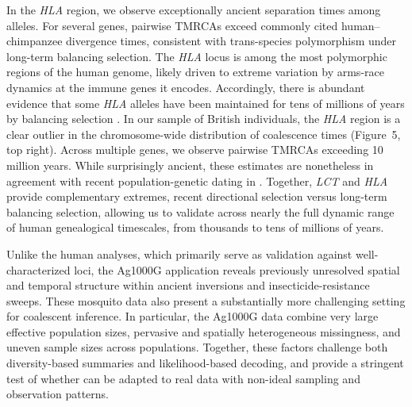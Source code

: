 \documentclass[9pt,twocolumn,twoside]{pnas-new}
\begin{document}
In the \emph{HLA} region,
we observe exceptionally ancient separation times among alleles.
For several genes,
pairwise TMRCAs exceed commonly cited human--chimpanzee divergence times,
consistent with trans-species polymorphism under long-term balancing selection.
The \emph{HLA} locus is among the most polymorphic regions of the human genome,
likely driven to extreme variation by arms-race dynamics at the immune genes it encodes.
Accordingly,
there is abundant evidence that some \emph{HLA} alleles have been maintained for tens of millions of years
by balancing selection \cite{hedrick1998balancing,azevedo2015trans,fortier2025ancient}.
In our sample of British individuals,
the \emph{HLA} region is a clear outlier in the chromosome-wide distribution of coalescence times
(Figure~5, top right).
Across multiple genes,
we observe pairwise TMRCAs exceeding 10 million years.
While surprisingly ancient,
these estimates are nonetheless in agreement with recent population-genetic dating in \cite{deng2025general}.
Together, \emph{LCT} and \emph{HLA} provide complementary extremes, 
recent directional selection versus long-term balancing selection, 
allowing us to validate \cxtkit across nearly the full dynamic range of human genealogical timescales,
from thousands to tens of millions of years.

Unlike the human analyses, which primarily serve as validation against well-characterized loci, 
the Ag1000G application reveals previously unresolved spatial and temporal structure within ancient inversions and insecticide-resistance sweeps.
These mosquito data also present a substantially more challenging setting for coalescent inference.
In particular,
the Ag1000G data combine very large effective population sizes,
pervasive and spatially heterogeneous missingness,
and uneven sample sizes across populations.
Together,
these factors challenge both diversity-based summaries and likelihood-based decoding,
and provide a stringent test of whether \cxtkit can be adapted to real data 
with non-ideal sampling and observation patterns.
\end{document}

